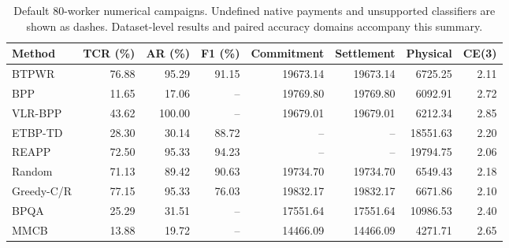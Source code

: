 \begin{table}[t]\centering\small
\caption{Default 80-worker numerical campaigns. Undefined native payments and unsupported classifiers are shown as dashes. Dataset-level results and paired accuracy domains accompany this summary.}
\label{tab:q36-default}
\begin{tabular}{lrrrrrrr}\toprule
Method&TCR (\%)&AR (\%)&F1 (\%)&Commitment&Settlement&Physical&CE(3)\\\midrule
BTPWR&76.88&95.29&91.15&19673.14&19673.14&6725.25&2.11\\
BPP&11.65&17.06&--&19769.80&19769.80&6092.91&2.72\\
VLR-BPP&43.62&100.00&--&19679.01&19679.01&6212.34&2.85\\
ETBP-TD&28.30&30.14&88.72&--&--&18551.63&2.20\\
REAPP&72.50&95.33&94.23&--&--&19794.75&2.06\\
Random&71.13&89.42&90.63&19734.70&19734.70&6549.43&2.18\\
Greedy-C/R&77.15&95.33&76.03&19832.17&19832.17&6671.86&2.10\\
BPQA&25.29&31.51&--&17551.64&17551.64&10986.53&2.40\\
MMCB&13.88&19.72&--&14466.09&14466.09&4271.71&2.65\\
\bottomrule\end{tabular}\end{table}
